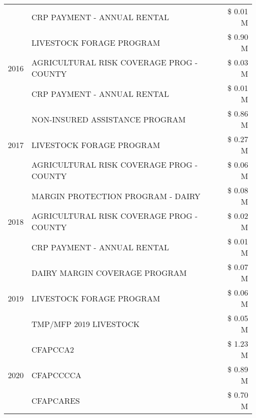 \begin{tabular}{llr}
 & CRP PAYMENT - ANNUAL RENTAL & \$ 0.01 M \\
\cline{1-3}
\multirow[t]{3}{*}{2016} & LIVESTOCK FORAGE PROGRAM                      & \$ 0.90 M \\
 & AGRICULTURAL RISK COVERAGE PROG - COUNTY      & \$ 0.03 M \\
 & CRP PAYMENT - ANNUAL RENTAL                   & \$ 0.01 M \\
\cline{1-3}
\multirow[t]{3}{*}{2017} & NON-INSURED ASSISTANCE PROGRAM & \$ 0.86 M \\
 & LIVESTOCK FORAGE PROGRAM & \$ 0.27 M \\
 & AGRICULTURAL RISK COVERAGE PROG - COUNTY & \$ 0.06 M \\
\cline{1-3}
\multirow[t]{3}{*}{2018} & MARGIN PROTECTION PROGRAM - DAIRY & \$ 0.08 M \\
 & AGRICULTURAL RISK COVERAGE PROG - COUNTY & \$ 0.02 M \\
 & CRP PAYMENT - ANNUAL RENTAL & \$ 0.01 M \\
\cline{1-3}
\multirow[t]{3}{*}{2019} & DAIRY MARGIN COVERAGE PROGRAM & \$ 0.07 M \\
 & LIVESTOCK FORAGE PROGRAM & \$ 0.06 M \\
 & TMP/MFP 2019 LIVESTOCK & \$ 0.05 M \\
\cline{1-3}
\multirow[t]{3}{*}{2020} & CFAPCCA2 & \$ 1.23 M \\
 & CFAPCCCCA & \$ 0.89 M \\
 & CFAPCARES & \$ 0.70 M \\
\cline{1-3}
\bottomrule
\end{tabular}
